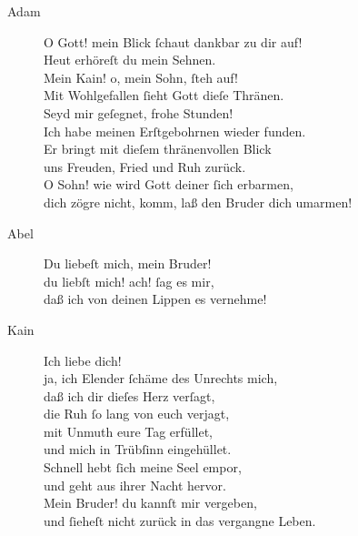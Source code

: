 \documentclass[parskip=full]{scrreprt}
\makeatletter
\DeclareRobustCommand{\ltseries}{\fontseries{lt}\selectfont}
\def\@firstoffour#1#2#3#4{#1}
\def\@secondoffour#1#2#3#4{#2}
\def\@thirdoffour#1#2#3#4{#3}
\def\@fourthoffour#1#2#3#4{#4}
\def\Dotfill{\leavevmode\cleaders\hb@xt@ .75em{\hss .\hss }\hfill \kern \z@}
\def\lyrefgenrenumber#1{\expandafter\@setref\csname r@#1\endcsname\@firstoffour{#1}}
\def\lyrefgenregenre#1{\expandafter\@setref\csname r@#1\endcsname\@secondoffour{#1}}
\def\lyrefgenretitle#1{\expandafter\@setref\csname r@#1\endcsname\@thirdoffour{#1}}
\def\lyrefgenrepage#1{\expandafter\@setref\csname r@#1\endcsname\@fourthoffour{#1}}
\def\lyrefsection#1{%
  \begingroup%
  \makebox[0pt][l]{\color{oldred}\lyrefgenrenumber{#1}}\hspace*{2em}%
  \makebox[0pt][l]{\ltseries\lyrefgenregenre{#1}}\hspace*{6.5em}%
  \lyrefgenretitle{#1}\Dotfill\lyrefgenrepage{#1}%
  \endgroup%
}
\newif\iftemplate\templatetrue
\makeatother
\begin{document}
\begin{description}
  \item[Adam]
  O Gott! mein Blick ſchaut dankbar zu dir auf!\\
  Heut erhöreſt du mein Sehnen.\\
  Mein Kain! o, mein Sohn, ſteh auf!\\
  Mit Wohlgefallen ſieht Gott dieſe Thränen.\\
  Seyd mir geſegnet, frohe Stunden!\\
  Ich habe meinen Erſtgebohrnen wieder funden.\\
  Er bringt mit dieſem thränenvollen Blick\\
  uns Freuden, Fried und Ruh zurück.\\
  O Sohn! wie wird Gott deiner ſich erbarmen,\\
  dich zögre nicht, komm, laß den Bruder dich umarmen!

  \item[Abel]
  Du liebeſt mich, mein Bruder!\\
  du liebſt mich! ach! ſag es mir,\\
  daß ich von deinen Lippen es vernehme!

  \item[Kain]
  Ich liebe dich!\\
  ja, ich Elender ſchäme des Unrechts mich,\\
  daß ich dir dieſes Herz verſagt,\\
  die Ruh ſo lang von euch verjagt,\\
  mit Unmuth eure Tag erfüllet,\\
  und mich in Trübſinn eingehüllet.\\
  Schnell hebt ſich meine Seel empor,\\
  und geht aus ihrer Nacht hervor.\\
  Mein Bruder! du kannſt mir vergeben,\\
  und ſieheſt nicht zurück in das vergangne Leben.
\end{description}

%
%

\cleardoublepage
\fi

\iftemplate

\fi
\end{document}
